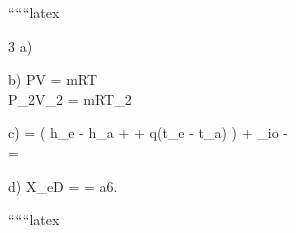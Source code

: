 
``````latex


3 a) 

b) \quad PV = mRT \\
\quad P_{2}V_{2} = mRT_{2}

c)  =  \left( h_{e} - h_{a} +  + q(t_{e} - t_{a}) \right) + _{io} - \sum {} \\
\quad =

d) \quad X_{eD} =  = a6.

``````latex


